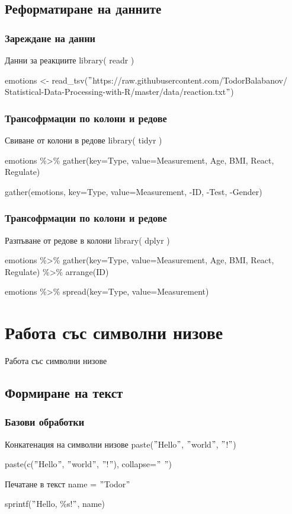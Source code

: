 \documentclass{beamer}
\begin{document}
\subsection{Реформатиране на данните}

\begin{frame}
\frametitle{Зареждане на данни}
\begin{block}{Данни за реакциите}
library( readr )

emotions <- read\_tsv($"$https://raw.githubusercontent.com/TodorBalabanov/ Statistical-Data-Processing-with-R/master/data/reaction.txt$"$)
\end{block}
\end{frame}

\begin{frame}
\frametitle{Трансофрмации по колони и редове}
\begin{block}{Свиване от колони в редове}
library( tidyr )

emotions \%>\% gather(key=Type, value=Measurement, Age, BMI, React, Regulate)

gather(emotions, key=Type, value=Measurement, -ID, -Test, -Gender)
\end{block}
\end{frame}

\begin{frame}
\frametitle{Трансофрмации по колони и редове}
\begin{block}{Разпъване от редове в колони}
library( dplyr )

emotions \%>\% gather(key=Type, value=Measurement, Age, BMI, React, Regulate) \%>\% arrange(ID)

emotions \%>\% spread(key=Type, value=Measurement)
\end{block}
\end{frame}

\section{Работа със символни низове}

\begin{frame}
\center \huge{Работа със символни низове}
\end{frame}

\subsection{Формиране на текст}

\begin{frame}
\frametitle{Базови обработки}
\begin{block}{Конкатенация на символни низове}
paste($"$Hello$"$, $"$world$"$, $"$!$"$)

paste(c($"$Hello$"$, $"$world$"$, $"$!$"$), collapse=$"$ $"$)
\end{block}

\begin{block}{Печатане в текст}
name = $"$Todor$"$

sprintf($"$Hello, \%s!$"$, name)
\end{block}
\end{frame}
\end{document}

